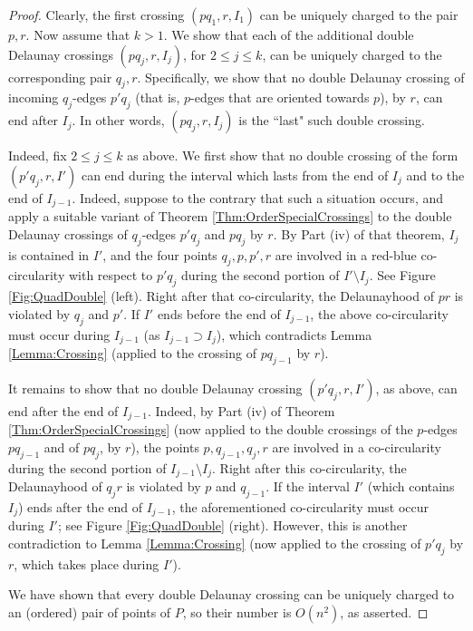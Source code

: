 \documentclass[letter,11pt]{article}
\begin{document}
\begin{proof}
Clearly, the first crossing $(pq_1,r,I_1)$ can be uniquely charged to the pair $p,r$.
Now assume that $k>1$. We show that each of the additional double Delaunay crossings $(pq_j,r,I_j)$, for $2\leq j\leq k$, 
can be uniquely charged to the corresponding pair $q_j,r$.
Specifically, we show that no double Delaunay crossing of incoming $q_j$-edges $p'q_j$ (that is, $p$-edges that are oriented towards $p$), by $r$, can end after $I_j$. In other words, $(pq_j,r,I_j)$ is the ``last" such double crossing.

Indeed, fix $2\leq j\leq k$ as above. We first show that no double crossing of the form $(p'q_j,r,I')$ can end during the interval which lasts from the end of $I_j$ and to the end of $I_{j-1}$. Indeed, suppose to the contrary that such a situation occurs, and apply a suitable variant of Theorem \ref{Thm:OrderSpecialCrossings} to the double Delaunay crossings of $q_j$-edges $p'q_j$ and $pq_j$ by $r$. 
By Part (iv) of that theorem, $I_j$ is contained in $I'$, and the four points $q_j,p,p',r$ are involved in a red-blue co-circularity with respect to $p'q_j$ during the second portion of $I'\setminus I_j$. See Figure \ref{Fig:QuadDouble} (left). Right after that co-circularity, the Delaunayhood of $pr$ is violated by $q_j$ and $p'$. If $I'$ ends before the end of $I_{j-1}$, the above co-circularity must occur during $I_{j-1}$ (as $I_{j-1}\supset I_j$), which contradicts Lemma \ref{Lemma:Crossing} (applied to the crossing of $pq_{j-1}$ by $r$).

It remains to show that no double Delaunay crossing $(p'q_j,r,I')$, as above, can end after the end of $I_{j-1}$. Indeed, by Part (iv) of Theorem \ref{Thm:OrderSpecialCrossings} (now applied to the double crossings of the $p$-edges $pq_{j-1}$ and of $pq_j$, by $r$), the points $p,q_{j-1},q_j,r$ are involved in a co-circularity during the second portion of $I_{j-1}\setminus I_j $. Right after this co-circularity, the Delaunayhood of $q_jr$ is violated by $p$ and $q_{j-1}$. 
If the interval $I'$ (which contains $I_j$) ends after the end of $I_{j-1}$, the aforementioned co-circularity must occur during $I'$; see Figure \ref{Fig:QuadDouble} (right). However, this is another contradiction to Lemma \ref{Lemma:Crossing} (now applied to the crossing of $p'q_j$ by $r$, which takes place during $I'$).

We have shown that every double Delaunay crossing can be uniquely charged to an (ordered) pair of points of $P$, so their number is $O(n^2)$, as asserted.
\end{proof}
\end{document}

